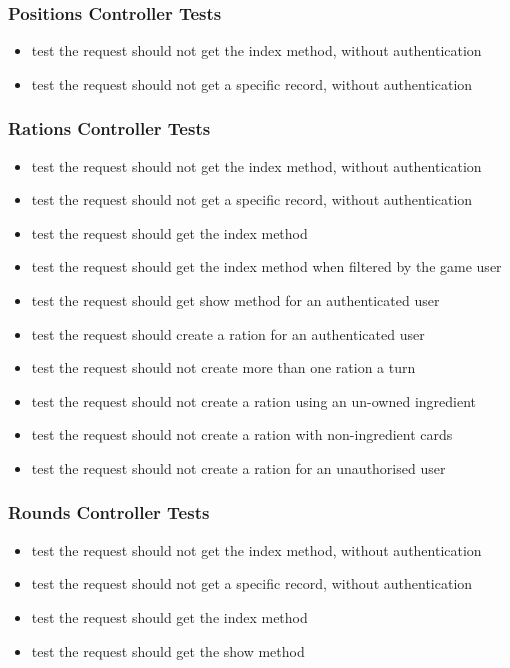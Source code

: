 \subsubsection{Positions Controller Tests}
\begin{itemize}
	\item test the request should not get the index method, without authentication
	\item test the request should not get a specific record, without authentication
\end{itemize}

\subsubsection{Rations Controller Tests}
\begin{itemize}
	\item test the request should not get the index method, without authentication
	\item test the request should not get a specific record, without authentication
	\item test the request should get the index method
	\item test the request should get the index method when filtered by the game user
	\item test the request should get show method for an authenticated user
	\item test the request should create a ration for an authenticated user
	\item test the request should not create more than one ration a turn
	\item test the request should not create a ration using an un-owned ingredient
	\item test the request should not create a ration with non-ingredient cards
	\item test the request should not create a ration for an unauthorised user
\end{itemize}

\subsubsection{Rounds Controller Tests}
\begin{itemize}
	\item test the request should not get the index method, without authentication
	\item test the request should not get a specific record, without authentication
	\item test the request should get the index method
	\item test the request should get the show method
\end{itemize}

